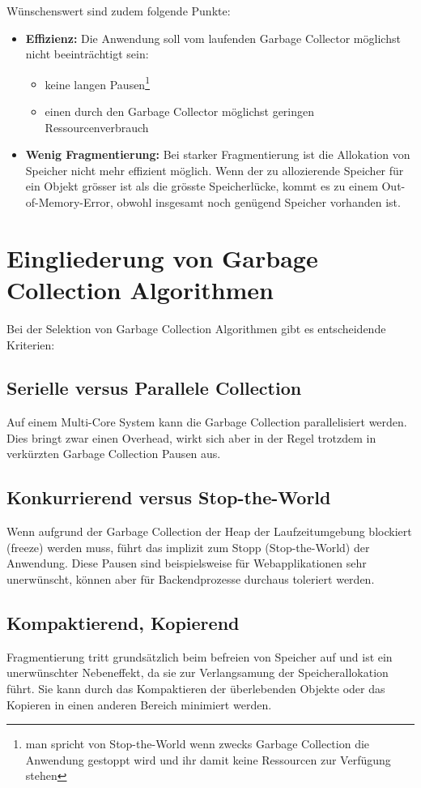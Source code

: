Wünschenswert sind zudem folgende Punkte\cite[S. 4]{sunMemoryManagementWP}:
\begin{itemize}
	\item \textbf{Effizienz:} Die Anwendung soll vom laufenden Garbage Collector möglichst nicht beeinträchtigt sein: 
		\begin{itemize}
			\item keine langen Pausen\footnote{man spricht von Stop-the-World wenn zwecks Garbage Collection die Anwendung gestoppt wird und ihr damit keine Ressourcen zur Verfügung stehen}
			\item einen durch den Garbage Collector möglichst geringen Ressourcenverbrauch
		\end{itemize}
	\item \textbf{Wenig Fragmentierung:} Bei starker Fragmentierung ist die Allokation von Speicher nicht mehr effizient möglich. Wenn der zu allozierende Speicher für ein Objekt grösser ist als die grösste Speicherlücke, kommt es zu einem Out-of-Memory-Error, obwohl insgesamt noch genügend Speicher vorhanden ist. 
\end{itemize}

\section{Eingliederung von Garbage Collection Algorithmen}
Bei der Selektion von Garbage Collection Algorithmen gibt es entscheidende Kriterien\cite[S. 5]{sunMemoryManagementWP}:
\subsection{Serielle versus Parallele Collection}
Auf einem Multi-Core System kann die Garbage Collection parallelisiert werden. Dies bringt zwar einen Overhead, wirkt sich aber in der Regel trotzdem in verkürzten Garbage Collection Pausen aus.

\subsection{Konkurrierend versus Stop-the-World}
Wenn aufgrund der Garbage Collection der Heap der Laufzeitumgebung blockiert (freeze) werden muss, führt das implizit zum Stopp (Stop-the-World) der Anwendung. Diese Pausen sind beispielsweise für Webapplikationen sehr unerwünscht, können aber für Backendprozesse durchaus toleriert werden.


\subsection{Kompaktierend, Kopierend}
Fragmentierung tritt grundsätzlich beim befreien von Speicher auf und ist ein unerwünschter Nebeneffekt, da sie zur Verlangsamung der Speicherallokation führt. Sie kann durch das Kompaktieren der überlebenden Objekte oder das Kopieren in einen anderen Bereich minimiert werden.


